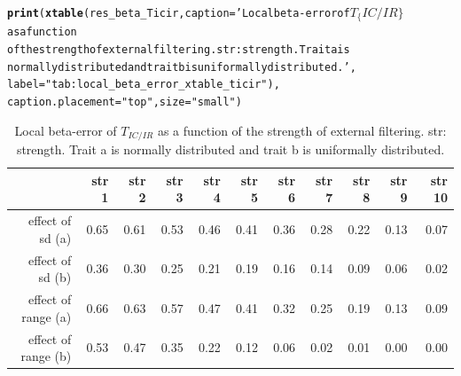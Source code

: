 \documentclass[12pt]{article}\usepackage[]{graphicx}\usepackage[]{color}
\makeatletter
\newcommand{\hlstr}[1]{\textcolor[rgb]{0.192,0.494,0.8}{#1}}%
\newcommand{\hlstd}[1]{\textcolor[rgb]{0.345,0.345,0.345}{#1}}%
\newcommand{\hlkwc}[1]{\textcolor[rgb]{0.333,0.667,0.333}{#1}}%
\newcommand{\hlkwd}[1]{\textcolor[rgb]{0.737,0.353,0.396}{\textbf{#1}}}%
\newenvironment{kframe}{%
 \def\at@end@of@kframe{}%
 \ifinner\ifhmode%
  \def\at@end@of@kframe{\end{minipage}}%
  \begin{minipage}{\columnwidth}%
 \fi\fi%
 \def\FrameCommand##1{\hskip\@totalleftmargin \hskip-\fboxsep
 \colorbox{shadecolor}{##1}\hskip-\fboxsep
     \hskip-\linewidth \hskip-\@totalleftmargin \hskip\columnwidth}%
 \MakeFramed {\advance\hsize-\width
   \@totalleftmargin\z@ \linewidth\hsize
   \@setminipage}}%
 {\par\unskip\endMakeFramed%
 \at@end@of@kframe}
\makeatother
\begin{document}
\begin{kframe}
\begin{alltt}
\hlkwd{print}\hlstd{(}\hlkwd{xtable}\hlstd{(res_beta_Ticir,} \hlkwc{caption} \hlstd{=} \hlstr{'Local beta-error of $T_\{IC/IR\}$ as a function 
             of the strength of external filtering. str: strength. Trait a is 
             normally distributed and trait b is uniformally distributed.'}\hlstd{,}
             \hlkwc{label} \hlstd{=} \hlstr{"tab:local_beta_error_xtable_ticir"}\hlstd{),}
      \hlkwc{caption.placement} \hlstd{=} \hlstr{"top"}\hlstd{,} \hlkwc{size} \hlstd{=} \hlstr{"small"}\hlstd{)}
\end{alltt}
\end{kframe}%
\begin{table}[ht]
\centering
\caption{Local beta-error of $T_{IC/IR}$ as a function 
             of the strength of external filtering. str: strength. Trait a is 
             normally distributed and trait b is uniformally distributed.} 
\label{tab:local_beta_error_xtable_ticir}
{\small
\begin{tabular}{rrrrrrrrrrr}
  \hline
 & str 1 & str 2 & str 3 & str 4 & str 5 & str 6 & str 7 & str 8 & str 9 & str 10 \\ 
  \hline
effect of sd (a) & 0.65 & 0.61 & 0.53 & 0.46 & 0.41 & 0.36 & 0.28 & 0.22 & 0.13 & 0.07 \\ 
  effect of sd (b) & 0.36 & 0.30 & 0.25 & 0.21 & 0.19 & 0.16 & 0.14 & 0.09 & 0.06 & 0.02 \\ 
  effect of range (a) & 0.66 & 0.63 & 0.57 & 0.47 & 0.41 & 0.32 & 0.25 & 0.19 & 0.13 & 0.09 \\ 
  effect of range (b) & 0.53 & 0.47 & 0.35 & 0.22 & 0.12 & 0.06 & 0.02 & 0.01 & 0.00 & 0.00 \\ 
   \hline
\end{tabular}
}
\end{table}
\end{document}
